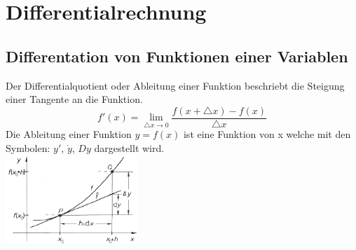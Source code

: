 \section{Differentialrechnung}
\subsection{Differentation von Funktionen einer Variablen}
Der Differentialquotient oder Ableitung einer Funktion beschriebt die Steigung einer Tangente an die Funktion.\\
\begin{equation*}
f'(x)=\lim\limits_{\triangle x \to 0}\frac{f(x + \triangle x)-f(x)}{\triangle x}
\end{equation*}
Die Ableitung einer Funktion $y=f(x)$ ist eine Funktion von x welche mit den Symbolen: $y'$, $\dot{y}$, $Dy$ dargestellt wird.\\
\includegraphics[width=5cm]{images/differential.png}
 
